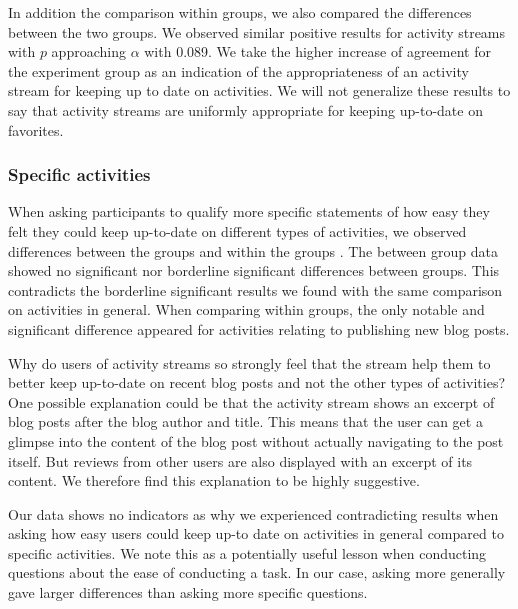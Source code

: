 In addition the comparison within
groups, we also compared the differences between the two groups. We observed
similar positive results for activity streams with $p$ approaching $\alpha$
with 0.089.
We take the higher increase of agreement for the experiment
group as an indication of the appropriateness of an activity stream for keeping
up to date on activities. We will not generalize these results to say that
activity streams are uniformly appropriate for keeping up-to-date on
favorites.

\subsubsection{Specific activities}

When asking participants to qualify more specific statements of how
easy they felt they could keep up-to-date on different types of activities,
we observed differences between%
the groups and within the groups%
.
The between group data showed no significant nor borderline significant
differences between groups. This contradicts the borderline significant
results we found with the same comparison on activities in general.
When comparing within groups, the only notable and significant difference
appeared for activities relating to publishing new blog posts.

Why do users of activity streams so strongly feel that the stream help them to
better keep up-to-date on recent blog posts and not the other types of
activities? One possible explanation could be that the activity stream
shows an excerpt of blog posts after the blog author and title.%
This means
that the user can get a glimpse into the content of the blog post without
actually navigating to the post itself.
But reviews from other users are also displayed with an excerpt of its
content. We therefore find this explanation to be highly suggestive.

Our data shows no indicators as why we experienced contradicting results
when asking how easy users could keep up-to date on activities in general
compared to specific activities. We note this as a potentially useful lesson
when conducting questions about the ease of conducting a task. In our case,
asking more generally gave larger differences than asking more specific
questions.

